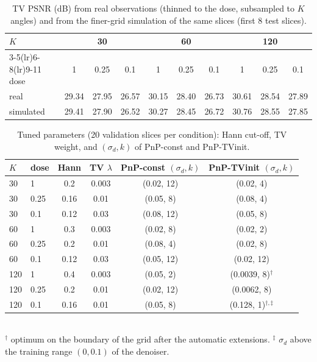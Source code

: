 \begin{table}[htbp]
\centering\small\setlength{\tabcolsep}{5pt}
\caption{TV PSNR (dB) from real observations (thinned to the dose, subsampled to $K$ angles) and from the finer-grid simulation of the same slices (first 8 test slices).}\label{tab:simcheck}
\begin{tabular}{llccccccccc}
\toprule
$K$ & & \multicolumn{3}{c}{30} & \multicolumn{3}{c}{60} & \multicolumn{3}{c}{120}\\
\cmidrule(lr){3-5}\cmidrule(lr){6-8}\cmidrule(lr){9-11}
dose & & 1 & 0.25 & 0.1 & 1 & 0.25 & 0.1 & 1 & 0.25 & 0.1\\
\midrule
real & & 29.34 & 27.95 & 26.57 & 30.15 & 28.40 & 26.73 & 30.61 & 28.54 & 27.89\\
simulated & & 29.41 & 27.90 & 26.52 & 30.27 & 28.45 & 26.72 & 30.76 & 28.55 & 27.85\\
\bottomrule
\end{tabular}
\end{table}

\begin{table}[htbp]
\centering\small\setlength{\tabcolsep}{4pt}
\caption{Tuned parameters (20 validation slices per condition): Hann cut-off, TV weight, and $(\sigma_d,k)$ of PnP-const and PnP-TVinit.
}\label{tab:params3}
\begin{tabular}{llcccc}
\toprule
$K$ & dose & Hann & TV $\lambda$ & PnP-const $(\sigma_d,k)$ & PnP-TVinit $(\sigma_d,k)$\\
\midrule
30  & 1    & 0.2  & 0.003 & (0.02, 12) & (0.02, 4)\\
30  & 0.25 & 0.16 & 0.01  & (0.05, 8)  & (0.08, 4)\\
30  & 0.1  & 0.12 & 0.03  & (0.08, 12) & (0.05, 8)\\
60  & 1    & 0.3  & 0.003 & (0.02, 8)  & (0.02, 2)\\
60  & 0.25 & 0.2  & 0.01  & (0.08, 4)  & (0.02, 8)\\
60  & 0.1  & 0.12 & 0.03  & (0.05, 12) & (0.02, 12)\\
120 & 1    & 0.4  & 0.003 & (0.05, 2)  & (0.0039, 8)$^\dagger$\\
120 & 0.25 & 0.2  & 0.01  & (0.02, 12) & (0.0062, 8)\\
120 & 0.1  & 0.16 & 0.01  & (0.05, 8)  & (0.128, 1)$^{\dagger,\ddagger}$\\
\bottomrule
\end{tabular}\\[2pt]
{\footnotesize $^\dagger$ optimum on the boundary of the grid after the automatic extensions. $^\ddagger$ $\sigma_d$ above the training range $(0,0.1)$ of the denoiser.}
\end{table}


